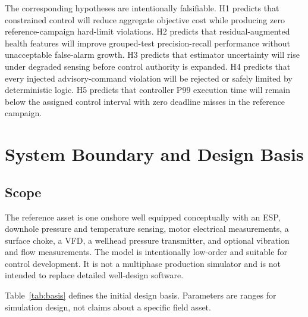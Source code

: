 \documentclass[conference]{IEEEtran}
\begin{document}
The corresponding hypotheses are intentionally falsifiable. H1 predicts that constrained control will reduce aggregate objective cost while producing zero reference-campaign hard-limit violations. H2 predicts that residual-augmented health features will improve grouped-test precision-recall performance without unacceptable false-alarm growth. H3 predicts that estimator uncertainty will rise under degraded sensing before control authority is expanded. H4 predicts that every injected advisory-command violation will be rejected or safely limited by deterministic logic. H5 predicts that controller P99 execution time will remain below the assigned control interval with zero deadline misses in the reference campaign.

\section{System Boundary and Design Basis}
\subsection{Scope}
The reference asset is one onshore well equipped conceptually with an ESP, downhole pressure and temperature sensing, motor electrical measurements, a surface choke, a VFD, a wellhead pressure transmitter, and optional vibration and flow measurements. The model is intentionally low-order and suitable for control development. It is not a multiphase production simulator and is not intended to replace detailed well-design software.

Table~\ref{tab:basis} defines the initial design basis. Parameters are ranges for simulation design, not claims about a specific field asset.
\end{document}
